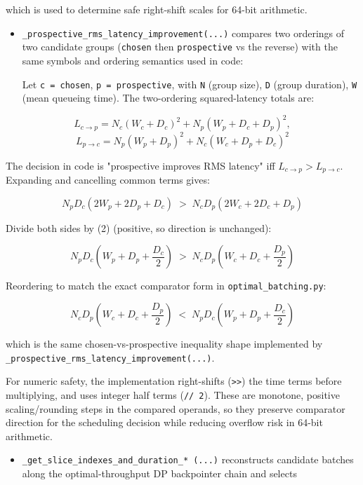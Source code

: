 \documentclass{article}
\providecommand{\tightlist}{\setlength{\itemsep}{0pt}\setlength{\parskip}{0pt}}
\begin{document}
which is used to determine safe right-shift scales for 64-bit
arithmetic.

\begin{itemize}
\item
  \texttt{\_prospective\_rms\_latency\_improvement(...)} compares two
  orderings of two candidate groups (\texttt{chosen} then
  \texttt{prospective} vs the reverse) with the same symbols and
  ordering semantics used in code:

  Let \texttt{c\ =\ chosen}, \texttt{p\ =\ prospective}, with \texttt{N}
  (group size), \texttt{D} (group duration), \texttt{W} (mean queueing
  time). The two-ordering squared-latency totals are:
\end{itemize}

\[
L_{c\to p}=N_c(W_c+D_c)^2+N_p(W_p+D_c+D_p)^2,
\]
\[
L_{p\to c}=N_p(W_p+D_p)^2+N_c(W_c+D_p+D_c)^2
\]

The decision in code is "prospective improves RMS latency" iff
\(L_{c\to p} > L_{p\to c}\).
Expanding and cancelling common terms gives:

\[
N_pD_c\!\left(2W_p+2D_p+D_c\right)
\;>\;
N_cD_p\!\left(2W_c+2D_c+D_p\right)
\]

Divide both sides by (2) (positive, so direction is unchanged):

\[
N_pD_c\!\left(W_p+D_p+\frac{D_c}{2}\right)
\;>\;
N_cD_p\!\left(W_c+D_c+\frac{D_p}{2}\right)
\]

Reordering to match the exact comparator form in
\texttt{optimal\_batching.py}:

\[
N_cD_p\!\left(W_c+D_c+\frac{D_p}{2}\right)
\;<\;
N_pD_c\!\left(W_p+D_p+\frac{D_c}{2}\right)
\]

which is the same chosen-vs-prospective inequality shape implemented by
\texttt{\_prospective\_rms\_latency\_improvement(...)}.

For numeric safety, the implementation right-shifts
(\texttt{\textgreater{}\textgreater{}}) the time terms before
multiplying, and uses integer half terms (\texttt{//\ 2}). These are
monotone, positive scaling/rounding steps in the compared operands, so
they preserve comparator direction for the scheduling decision while
reducing overflow risk in 64-bit arithmetic.

\begin{itemize}
\tightlist
\item
  \texttt{\_get\_slice\_indexes\_and\_duration\_*\ (...)} reconstructs
  candidate batches along the optimal-throughput DP backpointer chain
  and selects
\end{itemize}
\end{document}
